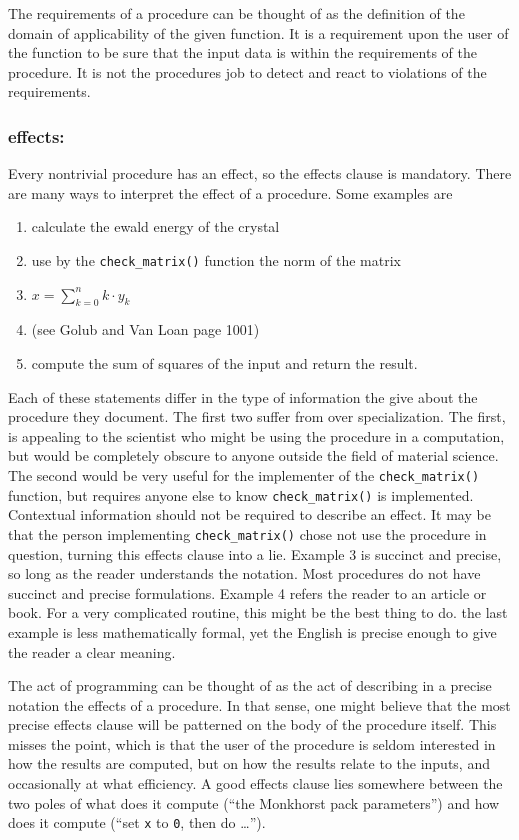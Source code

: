 The requirements of a procedure can be thought of as the definition of
the domain of applicability of the given function.  It is a requirement
upon the user of the function to be sure that the input data is within
the requirements of the procedure.  It is not the procedures job to
detect and react to violations of the requirements.

\subsubsection{effects:}

Every nontrivial procedure has an effect, so the effects clause is mandatory.
There are many ways to interpret the effect of a procedure.  Some examples
are
\begin{enumerate}
\item calculate the ewald energy of the crystal
\item use by the \verb+check_matrix()+ function the norm of the matrix
\item $x = \sum_{k=0}^{n} k \cdot y_k$
\item (see Golub and Van Loan page 1001)
\item compute the sum of squares of the input and return the result.
\end{enumerate}
Each of these statements differ in the type of information the give
about the procedure they document.  The first two suffer from over
specialization.  The first, is appealing to the scientist who might be
using the procedure in a computation, but would be completely obscure
to anyone outside the field of material science.  The second would be
very useful for the implementer of the \verb+check_matrix()+ function,
but requires anyone else to know \verb+check_matrix()+ is implemented.
Contextual information should not be required to describe an effect.
It may be that the person implementing \verb+check_matrix()+ chose not
use the procedure in question, turning this effects clause into a lie.
Example 3 is succinct and precise, so long as the reader understands
the notation.  Most procedures do not have succinct and precise
formulations.  Example 4 refers the reader to an article or book.  For
a very complicated routine, this might be the best thing to do.
the last example is less mathematically formal, yet the English is precise
enough to give the reader a clear meaning.

The act of programming can be thought of as the act of describing in
a precise notation the effects of a procedure.  In that sense, one might
believe that the most precise effects clause will be patterned on the
body of the procedure itself.  This misses the point, which is that
the user of the procedure is seldom interested in how the results are
computed, but on how the results relate to the inputs, and occasionally
at what efficiency.  A good effects clause lies somewhere between the
two poles of what does it compute (``the Monkhorst pack parameters'')
and how does it compute (``set \verb+x+ to \verb+0+, then do \dots'').

